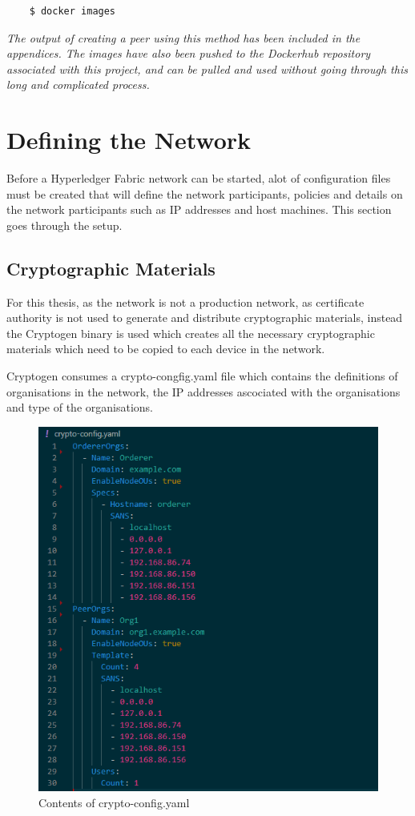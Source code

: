 \begin{verbatim}
    $ docker images
\end{verbatim}
\textit{The output of creating a peer using this method has been included in the appendices.
The images have also been pushed to the Dockerhub repository associated with this project, and can be pulled and used without going through this long and complicated process.
}
\section{Defining the Network}

Before a Hyperledger Fabric network can be started, alot of configuration files must be created that will define the network participants, policies and details on the network participants such as IP addresses and host machines. This section goes through the setup.

\subsection{Cryptographic Materials}

For this thesis, as the network is not a production network, as certificate authority is not used to generate and distribute cryptographic materials, instead the Cryptogen binary is used which creates all the necessary cryptographic materials which need to be copied to each device in the network. 

Cryptogen consumes a crypto-congfig.yaml file which contains the definitions of organisations in the network, the IP addresses ascociated with the organisations and type of the organisations.

\begin{figure}[H]
    \centering
    \includegraphics{images/cryptoconfigyaml.PNG}
    \caption{Contents of crypto-config.yaml}
    \label{fig:my_label}
\end{figure}

